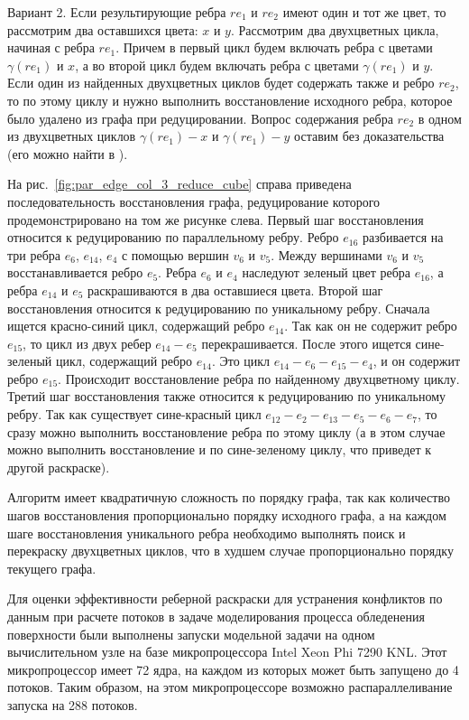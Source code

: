 Вариант 2. Если результирующие ребра $re_1$ и $re_2$ имеют один и тот же цвет, то рассмотрим два оставшихся цвета: $x$ и $y$.
Рассмотрим два двухцветных цикла, начиная с ребра $re_1$.
Причем в первый цикл будем включать ребра с цветами $\gamma(re_1)$ и $x$, а во второй цикл будем включать ребра с цветами $\gamma(re_1)$ и $y$.
Если один из найденных двухцветных циклов будет содержать также и ребро $re_2$, то по этому циклу и нужно выполнить восстановление исходного ребра, которое было удалено из графа при редуцировании.
Вопрос содержания ребра $re_2$ в одном из двухцветных циклов $\gamma(re_1) - x$ и $\gamma(re_1) - y$ оставим без доказательства (его можно найти в \cite{Kurapov2018}).

На рис.~\ref{fig:par_edge_col_3_reduce_cube} справа приведена последовательность восстановления графа, редуцирование которого продемонстрировано на том же рисунке слева.
Первый шаг восстановления относится к редуцированию по параллельному ребру.
Ребро $e_{16}$ разбивается на три ребра $e_6$, $e_{14}$, $e_4$ с помощью вершин $v_6$ и $v_5$.
Между вершинами $v_6$ и $v_5$ восстанавливается ребро $e_5$.
Ребра $e_6$ и $e_4$ наследуют зеленый цвет ребра $e_{16}$, а ребра $e_{14}$ и $e_5$ раскрашиваются в два оставшиеся цвета.
Второй шаг восстановления относится к редуцированию по уникальному ребру.
Сначала ищется красно-синий цикл, содержащий ребро $e_{14}$.
Так как он не содержит ребро $e_{15}$, то цикл из двух ребер $e_{14}-e_5$ перекрашивается.
После этого ищется сине-зеленый цикл, содержащий ребро $e_{14}$.
Это цикл $e_{14}-e_6-e_{15}-e_4$, и он содержит ребро $e_{15}$.
Происходит восстановление ребра по найденному двухцветному циклу.
Третий шаг восстановления также относится к редуцированию по уникальному ребру.
Так как существует сине-красный цикл $e_{12}-e_2-e_{13}-e_5-e_6-e_7$, то сразу можно выполнить восстановление ребра по этому циклу (а в этом случае можно выполнить восстановление и по сине-зеленому циклу, что приведет к другой раскраске).

Алгоритм имеет квадратичную сложность по порядку графа, так как количество шагов восстановления пропорционально порядку исходного графа, а на каждом шаге восстановления уникального ребра необходимо выполнять поиск и перекраску двухцветных циклов, что в худшем случае пропорционально порядку текущего графа.

Для оценки эффективности реберной раскраски для устранения конфликтов по данным при расчете потоков в задаче моделирования процесса обледенения поверхности были выполнены запуски модельной задачи на одном вычислительном узле на базе микропроцессора Intel Xeon Phi 7290 KNL\label{abbr:knl-3}.
Этот микропроцессор имеет 72 ядра, на каждом из которых может быть запущено до 4 потоков.
Таким образом, на этом микропроцессоре возможно распараллеливание запуска на 288 потоков.

